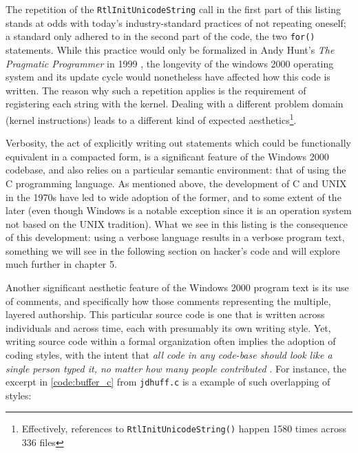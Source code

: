 The repetition of the \lstinline{RtlInitUnicodeString} call in the first part of this listing stands at odds with today's industry-standard practices of not repeating oneself; a standard only adhered to in the second part of the code, the two \lstinline{for()} statements. While this practice would only be formalized in Andy Hunt's \emph{The Pragmatic Programmer} in 1999 \citep{hunt_pragmatic_1999}, the longevity of the windows 2000 operating system and its update cycle would nonetheless have affected how this code is written. The reason why such a repetition applies is the requirement of registering each string with the kernel. Dealing with a different problem domain (kernel instructions) leads to a different kind of expected aesthetics\footnote{Effectively, references to \lstinline{RtlInitUnicodeString()} happen 1580 times across 336 files}.

Verbosity, the act of explicitly writing out statements which could be functionally equivalent in a compacted form, is a significant feature of the Windows 2000 codebase, and also relies on a particular semantic environment: that of using the C programming language. As mentioned above, the development of C and UNIX in the 1970s have led to wide adoption of the former, and to some extent of the later (even though Windows is a notable exception since it is an operation system not based on the UNIX tradition). What we see in this listing is the consequence of this development: using a verbose language results in a verbose program text, something we will see in the following section on hacker's code and will explore much further in chapter 5.

Another significant aesthetic feature of the Windows 2000 program text is its use of comments, and specifically how those comments representing the multiple, layered authorship. This particular source code is one that is written across individuals and across time, each with presumably its own writing style. Yet, writing source code within a formal organization often implies the adoption of coding styles, with the intent that \emph{all code in any code-base should look like a single person typed it, no matter how many people contributed} \citep{waldron_idiomatic_2020}. For instance, the excerpt in \ref{code:buffer_c} from \lstinline{jdhuff.c} is a example of such overlapping of styles:

